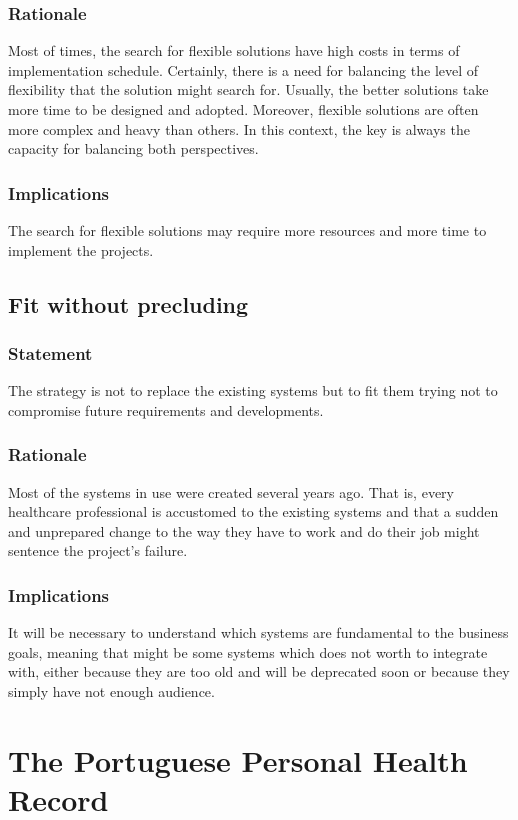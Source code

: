 \subsubsection{Rationale}
Most of times, the search for flexible solutions have high costs in terms of implementation schedule. Certainly, there is a need for balancing the level of flexibility that the solution might search for. Usually, the better solutions take more time to be designed and adopted. Moreover, flexible solutions are often more complex and heavy than others. In this context, the key is always the capacity for balancing both perspectives.
\subsubsection{Implications}
The search for flexible solutions may require more resources and more time to implement the projects.


\subsection{Fit without precluding}

\subsubsection{Statement}
The strategy is not to replace the existing systems but to fit them trying not to compromise future requirements and developments.
\subsubsection{Rationale}
Most of the systems in use were created several years ago. That is, every healthcare professional is accustomed to the existing systems and that a sudden and unprepared change to the way they have to work and do their job might sentence the project's failure.
\subsubsection{Implications}
It will be necessary to understand which systems are fundamental to the business goals, meaning that might be some systems which does not worth to integrate with, either because they are too old and will be deprecated soon or because they simply have not enough audience.






\section{The Portuguese Personal Health Record}

